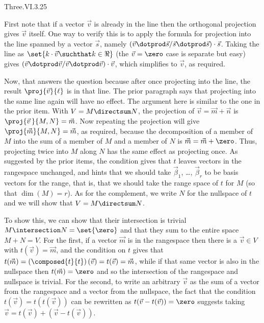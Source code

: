 \begin{ans}{Three.VI.3.25}
      \begin{exparts}
        \partsitem First note that if a vector $\vec{v}$ is already in the
          line then the orthogonal projection gives $\vec{v}$ itself.
          One way to verify this is to apply the
          formula for projection into the line spanned by a vector $\vec{s}$,
          namely $(\vec{v}\dotprod\vec{s}/\vec{s}\dotprod\vec{s})\cdot\vec{s}$.
          Taking the line as
          $\set{k\cdot\vec{v}\suchthat k\in\Re}$
          (the $\vec{v}=\zero$ case is separate but easy) gives
          $(\vec{v}\dotprod\vec{v}/\vec{v}\dotprod\vec{v})\cdot\vec{v}$,
          which simplifies to $\vec{v}$, as required.

          Now, that answers the question because after once projecting into
          the line, the result $\proj{\vec{v}}{\ell}$ is in that line.
          The prior paragraph says that projecting into the same line again
          will have no effect.
        \partsitem The argument here is similar to the one in the prior item.
          With $V=M\directsum N$, the projection of $\vec{v}=\vec{m}+\vec{n}$
          is $\proj{\vec{v}\,}{M,N}=\vec{m}$.
          Now repeating the projection will give $\proj{\vec{m}}{M,N}=\vec{m}$,
          as required, because the decomposition of a member of $M$ into the
          sum of a member of $M$ and a member of $N$ is
          $\vec{m}=\vec{m}+\zero$.
          Thus, projecting twice into $M$ along $N$ has the same effect as
          projecting once.
        \partsitem As suggested by the prior items, the condition
          gives that $t$ leaves vectors in the rangespace unchanged,
          and hints that we should take
          $\vec{\beta}_1$, \ldots, $\vec{\beta}_r$
          to be basis vectors for the range, that is, that we should take
          the range space of $t$ for $M$ (so that $\dim(M)=r$).
          As for the complement, we write $N$ for the nullspace of $t$
          and we will show that $V=M\directsum N$.

          To show this, we can show that their intersection
          is trivial $M\intersection N=\set{\zero}$ and that they sum to
          the entire space $M+N=V$.
          For the first, if a vector $\vec{m}$ is in the rangespace
          then there is a $\vec{v}\in V$ with $t(\vec{v})=\vec{m}$,
          and the condition on $t$ gives that
          $t(\vec{m})=(\composed{t}{t})\,(\vec{v})=t(\vec{v})=\vec{m}$, while
          if that same vector is also in the nullspace then $t(\vec{m})=\zero$
          and so the intersection of the rangespace and nullspace is trivial.
          For the second, to write an arbitrary $\vec{v}$ as the sum of
          a vector from the rangespace and a vector from the nullspace,
          the fact that the condition $t(\vec{v})=t(t(\vec{v}))$ can be
          rewritten as $t(\vec{v}-t(\vec{v}))=\zero$ suggests taking
          $\vec{v}=t(\vec{v})+(\vec{v}-t(\vec{v}))$.


\end{exparts}
\end{ans}
